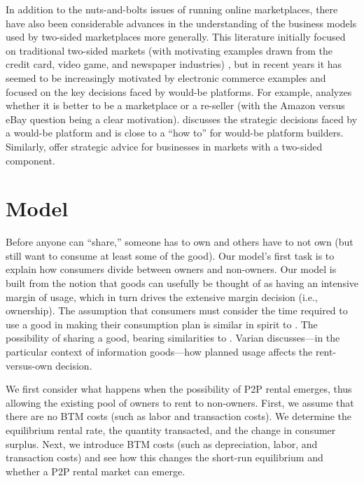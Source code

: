 \documentclass[11pt]{article}
\begin{document}
In addition to the nuts-and-bolts issues of running online marketplaces, there have also been considerable advances in the understanding of the business models used by two-sided marketplaces more generally. 
This literature initially focused on traditional two-sided markets (with motivating examples drawn from the credit card, video game, and  newspaper industries) \citep{rochet2003platform, rochet2006two}, 
but in recent years it has seemed to be increasingly motivated by electronic commerce examples and focused on the key decisions faced by would-be platforms.
For example, \cite{hagiu2014marketplace} analyzes whether it is better to be a marketplace or a re-seller (with the Amazon versus eBay question being a clear motivation).
\cite{hagiu2014strategic} discusses the strategic decisions faced by a would-be platform and is close to a ``how to'' for would-be platform builders.
Similarly, \cite{eisenmann2006strategies} offer strategic advice for businesses in markets with a two-sided component.  

\section{Model} \label{sec:model}

Before anyone can ``share,'' someone has to own and others have to not own (but still want to consume at least some of the good).
Our model's first task is to explain how consumers divide between owners and non-owners. 
Our model is built from the notion that goods can usefully be thought of as having an intensive margin of usage, which in turn drives the extensive margin decision (i.e., ownership). 
The assumption that consumers must consider the time required to use a good in making their consumption plan is similar in spirit to \cite{becker1965theory}.
The possibility of sharing a good, bearing similarities to \cite{varian2000}.
Varian discusses---in the particular context of information goods---how planned usage affects the rent-versus-own decision. 

We first consider what happens when the possibility of P2P rental emerges, thus allowing the existing pool of owners to rent to non-owners. 
First, we assume that there are no BTM costs (such as labor and transaction costs).
We determine the equilibrium rental rate, the quantity transacted, and the change in consumer surplus. 
Next, we introduce BTM costs (such as depreciation, labor, and transaction costs) and see how this changes the short-run equilibrium and whether a P2P rental market can emerge. 
\end{document}

